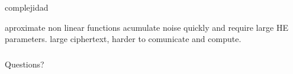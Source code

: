 \documentclass[10pt,handout]{beamer}
\begin{document}
\begin{frame}
\frametitle{}
complejidad

aproximate non linear functions acumulate noise quickly and require large HE parameters. large ciphertext, harder to comunicate and compute.
\end{frame}




\begin{frame}
\frametitle{}

\end{frame}




\begin{frame}
\frametitle{}

\end{frame}


\begin{frame}
\frametitle{}

\end{frame}




\begin{frame}
\frametitle{}
\Huge

\begin{center}
   Questions?
\end{center}
\end{frame}


\end{document}
